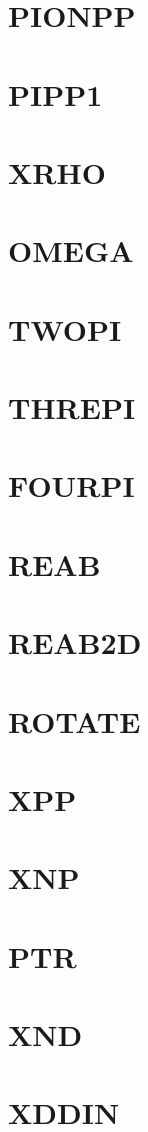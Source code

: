 \documentclass[10pt,UTF8]{ctexbook}
\begin{document}
\section{PIONPP}
\section{PIPP1}
\section{XRHO}
\section{OMEGA}
\section{TWOPI}
\section{THREPI}
\section{FOURPI}
\section{REAB}
\section{REAB2D}
\section{ROTATE}
\section{XPP}
\section{XNP}
\section{PTR}
\section{XND}
\section{XDDIN}
\end{document}
